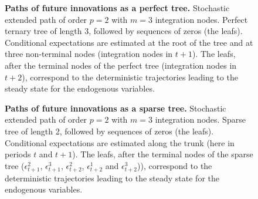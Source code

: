 \documentclass[a4paper,11pt]{amsart}
\begin{document}
\begin{figure}[H]
   \centering
   {\tiny
      }
   \bigskip\bigskip
   \caption{\textbf{Paths of  future innovations as a perfect tree.} Stochastic extended path of order $p=2$ with $m=3$ integration nodes. Perfect ternary tree of length 3, followed by sequences of zeros (the leafs). Conditional expectations are estimated at the root of the tree and at three non-terminal nodes (integration nodes in $t+1$). The leafs, after the terminal nodes of the perfect tree (integration nodes in $t+2$), correspond to the deterministic trajectories leading to the steady state for the endogenous variables.}
   \label{fig:sep:tree}
\end{figure}


\begin{figure}[H]
   \centering
   {\tiny
      }
   \bigskip\bigskip
   \caption{\textbf{Paths of  future innovations as a sparse tree.} Stochastic extended path of order $p=2$ with $m=3$ integration nodes. Sparse tree of length 2, followed by sequences of zeros (the leafs). Conditional expectations are estimated along the trunk (here in periods $t$ and $t+1$). The leafs, after the terminal nodes of the sparse tree ($\epsilon_{t+1}^2$, $\epsilon_{t+1}^3$, $\epsilon_{t+2}^2$, $\epsilon_{t+2}^1$ and $\epsilon_{t+2}^3$)), correspond to the deterministic trajectories leading to the steady state for the endogenous variables.}
   \label{fig:sep:sparse-tree}
\end{figure}
\end{document}
